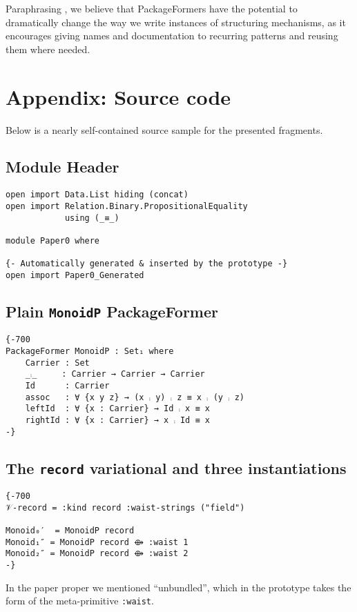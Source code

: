 \documentclass[sigplan,screen]{acmart}
\begin{document}
Paraphrasing \cite{deriving_via},
we believe that PackageFormers have the potential to dramatically change the way we write instances
of structuring mechanisms, as it encourages giving names and documentation to recurring patterns
and reusing them where needed.




\newpage
\section{Appendix: Source code}
\label{sec:org0c8a7df}

Below is a nearly self-contained source sample for the presented fragments.

\subsection{Module Header}
\label{sec:org8b993d2}
\begin{verbatim}
open import Data.List hiding (concat)
open import Relation.Binary.PropositionalEquality
            using (_≡_)

module Paper0 where

{- Automatically generated & inserted by the prototype -}
open import Paper0_Generated
\end{verbatim}

\subsection{Plain \texttt{MonoidP} PackageFormer}
\label{sec:org139bfa2}
\begin{verbatim}
{-700
PackageFormer MonoidP : Set₁ where
    Carrier : Set
    _⨾_     : Carrier → Carrier → Carrier
    Id      : Carrier
    assoc   : ∀ {x y z} → (x ⨾ y) ⨾ z ≡ x ⨾ (y ⨾ z)
    leftId  : ∀ {x : Carrier} → Id ⨾ x ≡ x
    rightId : ∀ {x : Carrier} → x ⨾ Id ≡ x
-}
\end{verbatim}

\subsection{The \texttt{record} variational and three instantiations}
\label{sec:org4aa2fd2}
\begin{verbatim}
{-700
𝒱-record = :kind record :waist-strings ("field")

Monoid₀′  = MonoidP record
Monoid₁″ = MonoidP record ⟴ :waist 1
Monoid₂″ = MonoidP record ⟴ :waist 2
-}
\end{verbatim}
In the paper proper we mentioned “unbundled”, which in the prototype
takes the form of the meta-primitive \texttt{:waist}.
\end{document}
